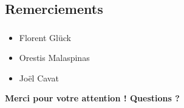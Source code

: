 \documentclass[10pt]{beamer}
\begin{document}
\subsection{Remerciements}
\begin{frame}
    \frametitle{\subsecname}
    \begin{itemize}
        \item Florent Glück
        \item Orestis Malaspinas
        \item Joël Cavat
    \end{itemize}
    \bigbreak
    \pause
    \fontsize{14pt}{15}\selectfont
    \begin{center}
        \textbf{Merci pour votre attention ! Questions ?}
    \end{center}
\end{frame}
\end{document}
